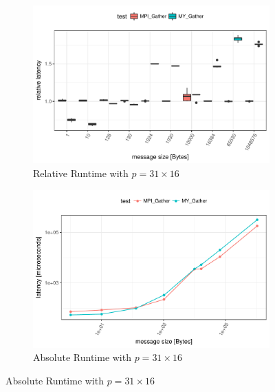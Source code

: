 \begin{figure}[h]
    \centering
    
    \begin{subfigure}[b]{0.49\textwidth}
        \includegraphics[width=\textwidth]{../benchmarks/mpich/binom/gather_31/rel_runtime.pdf}
        \caption{Relative Runtime with $p=31 \times 16$}
        \label{fig:Gather:MPICH:Rel:31}
    \end{subfigure}
    \begin{subfigure}[b]{0.49\textwidth}
        \includegraphics[width=\textwidth]{../benchmarks/mpich/binom/gather_31/runtime.pdf}
        \caption{Absolute Runtime with $p=31 \times 16$}
        \label{fig:Gather:MPICH:Abs:31}
    \end{subfigure}
    

\end{figure}
